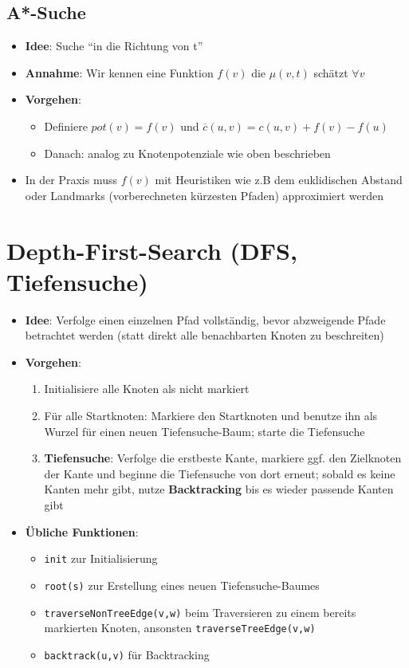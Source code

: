 \documentclass[10pt,a4paper]{article}
\newcommand{\quotestyle}[1]{\enquote{#1}}
\begin{document}
	\subsection{A*-Suche}
	\label{sp:sub:a_suche}
	
	\begin{itemize}
		\item \textbf{Idee}: Suche \quotestyle{in die Richtung von t}
		\item \textbf{Annahme}: Wir kennen eine Funktion $f(v)$ die $\mu(v,t)$ schätzt $\forall v$
		\item \textbf{Vorgehen}:
		\begin{itemize}
			\item Definiere $pot(v) = f(v)$ und $\overline{c}(u,v) = c(u,v) + f(v) - f(u)$
			\item Danach: analog zu Knotenpotenziale wie oben beschrieben
		\end{itemize}
		\item In der Praxis muss $f(v)$ mit Heuristiken wie z.B dem euklidischen Abstand oder Landmarks (vorberechneten kürzesten Pfaden) approximiert werden
	\end{itemize}

	\newpage
	\section{Depth-First-Search (DFS, Tiefensuche)}
	\label{dfs:sec:depth_first_search}
	
	\begin{itemize}
		\item \textbf{Idee}: Verfolge einen einzelnen Pfad vollständig, bevor abzweigende Pfade betrachtet werden (statt direkt alle benachbarten Knoten zu beschreiten)
		\item \textbf{Vorgehen}:
		\begin{enumerate}
			\item Initialisiere alle Knoten als nicht markiert
			\item Für alle Startknoten: Markiere den Startknoten und benutze ihn als Wurzel für einen neuen Tiefensuche-Baum; starte die Tiefensuche
			\item \textbf{Tiefensuche}: Verfolge die erstbeste Kante, markiere ggf. den Zielknoten der Kante und beginne die Tiefensuche von dort erneut; sobald es keine Kanten mehr gibt, nutze \textbf{Backtracking} bis es wieder passende Kanten gibt
		\end{enumerate}
		\item \textbf{Übliche Funktionen}:
		\begin{itemize}
			\item \texttt{init} zur Initialisierung
			\item \texttt{root(s)} zur Erstellung eines neuen Tiefensuche-Baumes
			\item \texttt{traverseNonTreeEdge(v,w)} beim Traversieren zu einem bereits markierten Knoten, ansonsten \texttt{traverseTreeEdge(v,w)}
			\item \texttt{backtrack(u,v)} für Backtracking
		\end{itemize}
	\end{itemize}
\end{document}
